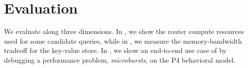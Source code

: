 \section{Evaluation}
\label{sec:eval}



We evaluate \TheSystem along three dimensions. In , we show
the router compute resources used for some candidate \TheSystem queries, while
in , we measure the memory-bandwidth tradeoff for the
key-value store. In , we show an end-to-end use case of
\TheSystem by debugging a performance problem, {\em microbursts,} on the P4
behavioral model.








